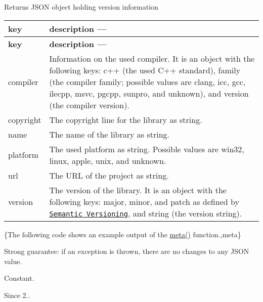 \begin{DoxyReturn}{Returns}
J\+S\+ON object holding version information \tabulinesep=1mm
\begin{longtabu} spread 0pt [c]{*{2}{|X[-1]}|}
\hline
\rowcolor{\tableheadbgcolor}\textbf{ key  }&\textbf{ description ---   }\\
\endfirsthead
\hline
\endfoot
\hline
\rowcolor{\tableheadbgcolor}\textbf{ key  }&\textbf{ description ---   }\\
\endhead
{\ttfamily compiler}  &Information on the used compiler. It is an object with the following keys\+: {\ttfamily c++} (the used C++ standard), {\ttfamily family} (the compiler family; possible values are {\ttfamily clang}, {\ttfamily icc}, {\ttfamily gcc}, {\ttfamily ilecpp}, {\ttfamily msvc}, {\ttfamily pgcpp}, {\ttfamily sunpro}, and {\ttfamily unknown}), and {\ttfamily version} (the compiler version).   \\
{\ttfamily copyright}  &The copyright line for the library as string.   \\
{\ttfamily name}  &The name of the library as string.   \\
{\ttfamily platform}  &The used platform as string. Possible values are {\ttfamily win32}, {\ttfamily linux}, {\ttfamily apple}, {\ttfamily unix}, and {\ttfamily unknown}.   \\
{\ttfamily url}  &The U\+RL of the project as string.   \\
{\ttfamily version}  &The version of the library. It is an object with the following keys\+: {\ttfamily major}, {\ttfamily minor}, and {\ttfamily patch} as defined by \href{http://semver.org}{\tt Semantic Versioning}, and {\ttfamily string} (the version string).   \\
\end{longtabu}

\end{DoxyReturn}
\{The following code shows an example output of the {\ttfamily \mbox{\hyperlink{classnlohmann_1_1basic__json_a677318a34ade7f8177a2784c06aa3671}{meta()}}} function.,meta\}

Strong guarantee\+: if an exception is thrown, there are no changes to any J\+S\+ON value.

Constant.

\begin{DoxySince}{Since}
2.. 
\end{DoxySince}
\mbox{\label{classnlohmann_1_1basic__json_a31f84ee15c4690ff705bed74736d04c6}} 
